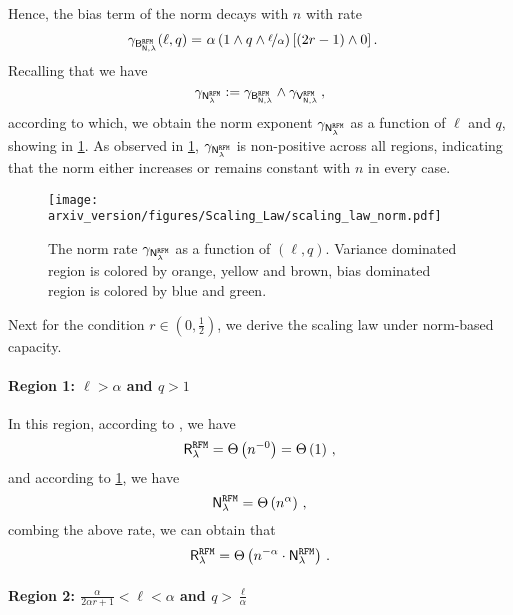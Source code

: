 Hence, the bias term of the norm decays with $n$ with rate
\[
\begin{aligned}
\gamma_{\mathsf B_{\mathsf N,\lambda}^{\tt RFM}}(\ell, q) =&~ \alpha \left(1 \wedge q \wedge \nicefrac{\ell}{\alpha}\right) \left[(2r-1)\wedge 0\right].
\end{aligned}
\]
Recalling that we have
\[
\gamma_{\mathsf N_\lambda^{\tt RFM}} := \gamma_{\mathsf B_{\mathsf N,\lambda}^{\tt RFM}} \wedge \gamma_{\mathsf V_{\mathsf N,\lambda}^{\tt RFM}}\,,
\]
according to which, we obtain the norm exponent $\gamma_{\mathsf N_\lambda^{\tt RFM}}$ as a function of $\ell$ and $q$, showing in \cref{fig:scaling_law}. As observed in \cref{fig:scaling_law}, $\gamma_{\mathsf N_\lambda^{\tt RFM}}$ is non-positive across all regions, indicating that the norm either increases or remains constant with \(n\) in every case.

\begin{figure}[H]
    \centering
    \texttt{[image: arxiv\_version/figures/Scaling\_Law/scaling\_law\_norm.pdf]} 
    \caption{The norm rate $\gamma_{\mathsf N_\lambda^{\tt RFM}}$ as a function of $(\ell,q)$. Variance dominated region is colored by {\color{regionorange}orange}, {\color{regionyellow}yellow} and {\color{regionbrown}brown}, bias dominated region is colored by {\color{regionblue}blue} and {\color{regiongreen}green}.} 
    \label{fig:scaling_law} 
\end{figure}

Next for the condition $r \in (0, \frac{1}{2})$, we derive the scaling law under norm-based capacity.

\paragraph{Region 1: $\ell > \alpha$ and $q > 1$}

In this region, according to \citet[Corollary 4.1]{defilippis2024dimension}, we have
\[
\mathsf R_\lambda^{\tt RFM} = \Theta\left( n^{-0} \right) = \Theta\left( 1 \right)\,,
\]
and according to \cref{fig:scaling_law}, we have
\[
\mathsf N_\lambda^{\tt RFM} = \Theta\left( n^{\alpha} \right)\,,
\]
combing the above rate, we can obtain that
\[
\mathsf R_\lambda^{\tt RFM} = \Theta\left( n^{-\alpha} \cdot \mathsf N_\lambda^{\tt RFM} \right)\,.
\]

\paragraph{Region 2: $\frac{\alpha}{2\alpha r+1} < \ell < \alpha$ and $q > \frac{\ell}{\alpha}$}

